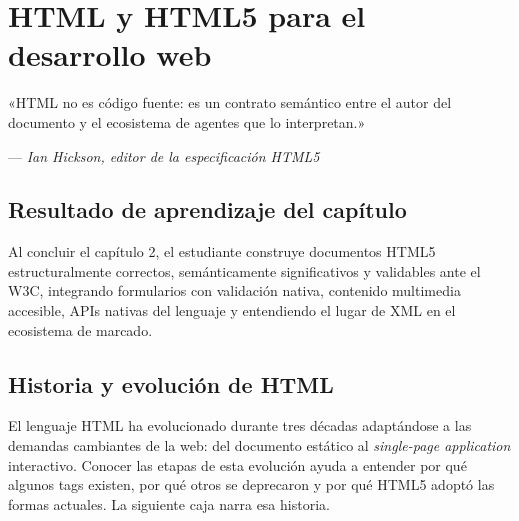\chapter{HTML y HTML5 para el desarrollo web}
\label{cap:semana2}

\epigraph{«HTML no es código fuente: es un contrato semántico entre el
autor del documento y el ecosistema de agentes que lo interpretan.»}
{--- \textit{Ian Hickson, editor de la especificación HTML5}}

\section*{Resultado de aprendizaje del capítulo}
Al concluir el capítulo 2, el estudiante construye documentos HTML5
estructuralmente correctos, semánticamente significativos y validables
ante el W3C, integrando formularios con validación nativa, contenido
multimedia accesible, APIs nativas del lenguaje y entendiendo el lugar
de XML en el ecosistema de marcado.

\section{Historia y evolución de HTML}

El lenguaje HTML ha evolucionado durante tres décadas
adaptándose a las demandas cambiantes de la web: del documento
estático al \emph{single-page application} interactivo. Conocer las
etapas de esta evolución ayuda a entender por qué algunos tags
existen, por qué otros se deprecaron y por qué HTML5 adoptó las
formas actuales. La siguiente caja narra esa historia.


